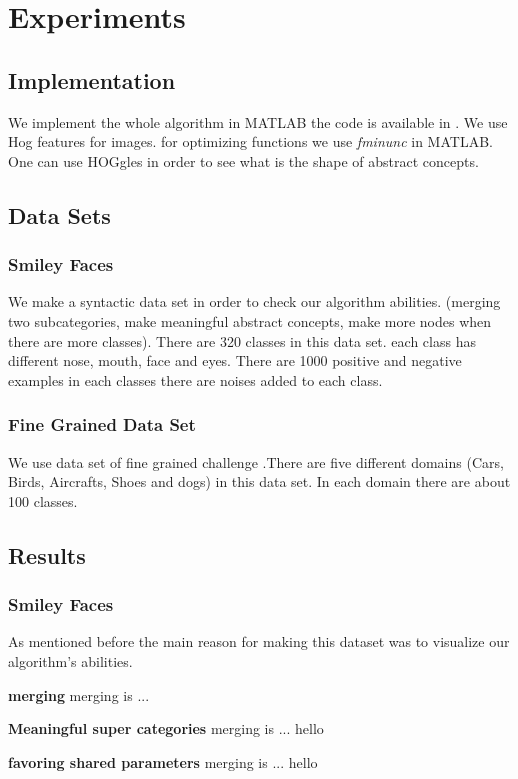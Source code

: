 \documentclass[10pt,twocolumn,letterpaper]{article}
\begin{document}
\section {Experiments}
 
 \subsection {Implementation}
 We implement the whole algorithm in MATLAB the code is available in \cite{website:sourceCode}. We use Hog features for images. for optimizing functions we use \textit{fminunc} in MATLAB.
 One can use HOGgles \cite{hoggles} in order to see what is the shape of abstract concepts.
 
 \subsection{Data Sets}
 \subsubsection{Smiley Faces}
 We make a syntactic data set in order to check our algorithm abilities. (merging two subcategories, make meaningful abstract concepts, make more nodes when there are more classes). There are 320 classes in this data set. each class has different nose, mouth, face and eyes. There are 1000 positive and negative examples in each classes there are noises added to each class. 
 \subsubsection{Fine Grained Data Set}
 We use data set of fine grained challenge \cite{dataset}.There are five different domains (Cars, Birds, Aircrafts, Shoes and dogs) in this data set. In each domain there are about 100 classes. 
 \subsection{Results}
 \subsubsection{Smiley Faces}
 As mentioned before the main reason for making this dataset was to visualize our algorithm's abilities.
 
 
\textbf{merging} merging is ...
 
 
\textbf{Meaningful super categories} merging is ...
  hello
  
  
\textbf{favoring shared parameters} merging is ...
hello
\end{document}
